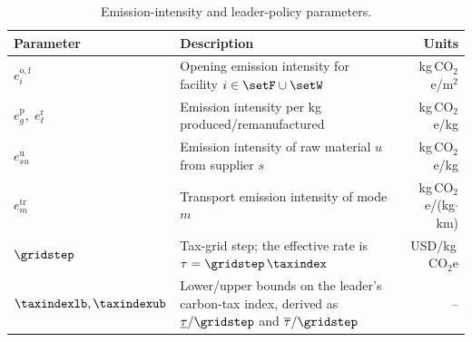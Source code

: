 \begin{table}[htbp]
\centering
\caption{Emission-intensity and leader-policy parameters.}
\label{tab:emission_params}
\footnotesize
\renewcommand{\arraystretch}{1.15}
\begin{tabular}{@{}llr@{}}
\toprule
Parameter & Description & Units \\
\midrule
$e^{\mathrm{o,f}}_i$ & Opening emission intensity for facility $i\in\setF\cup\setW$ & kg\,CO$_2$e/m$^2$ \\
$e^{\mathrm{p}}_g,\;e^{\mathrm{r}}_{\ell}$ & Emission intensity per kg produced/remanufactured & kg\,CO$_2$e/kg \\
$e^{\mathrm{u}}_{su}$ & Emission intensity of raw material $u$ from supplier $s$ & kg\,CO$_2$e/kg \\
$e^{\mathrm{tr}}_m$ & Transport emission intensity of mode $m$ & kg\,CO$_2$e/(kg$\cdot$km) \\
$\gridstep$ & Tax-grid step; the effective rate is $\tau=\gridstep\,\taxindex$ & USD/kg\,CO$_2$e \\
$\taxindexlb,\taxindexub$ & Lower/upper bounds on the leader's carbon-tax index, derived as $\underline{\tau}/\gridstep$ and $\overline{\tau}/\gridstep$ & -- \\
\bottomrule
\end{tabular}
\end{table}

